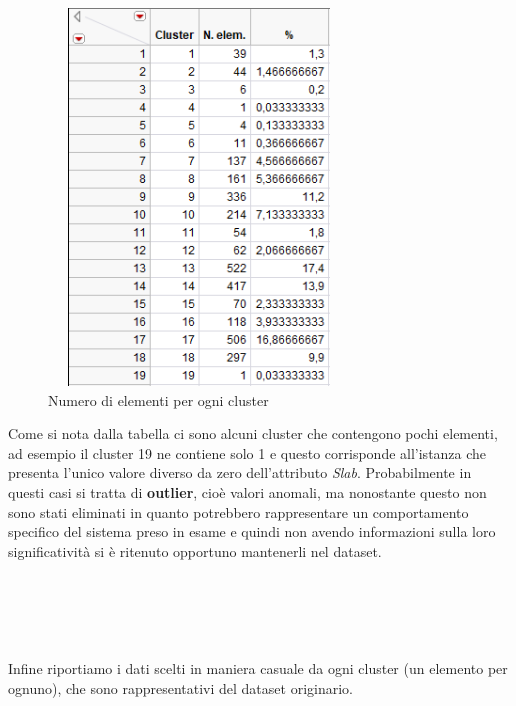 \begin{figure}[!h]
	\centering
	\includegraphics[width=8cm, height=10cm]{./immagine/cluster_size.png}
	\caption{Numero di elementi per ogni cluster}
	\label{fig:cluster_size}
\end{figure}

Come si nota dalla tabella ci sono alcuni cluster che contengono pochi elementi, ad esempio il cluster 19 ne contiene solo 1 e questo corrisponde all'istanza che presenta l'unico valore diverso da zero dell'attributo \textit{Slab}. Probabilmente in questi casi si tratta di \textbf{outlier}, cioè valori anomali, ma nonostante questo non sono stati eliminati in quanto potrebbero rappresentare un comportamento specifico del sistema preso in esame e quindi non avendo informazioni sulla loro significatività si è ritenuto opportuno mantenerli nel dataset.\\\\\\\\\\\\
Infine riportiamo i dati scelti in maniera casuale da ogni cluster (un elemento per ognuno), che sono rappresentativi del dataset originario.\\\\

